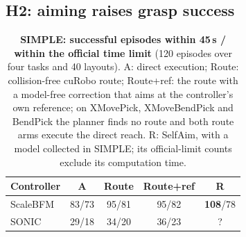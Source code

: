 \documentclass[conference]{IEEEtran}
\newcommand{\Ad}{\textsc{A}}       %
\newcommand{\Rr}{\textsc{R}}       %
\begin{document}
\subsection{H2: aiming raises grasp success}
\begin{table}[t]
\centering
\caption{\textbf{SIMPLE: successful episodes within 45\,s / within the official time limit} (120 episodes over four tasks and 40 layouts). \Ad: direct execution; Route: collision-free cuRobo route; Route+ref: the route with a model-free correction that aims at the controller's own reference; on XMovePick, XMoveBendPick and BendPick the planner finds no route and both route arms execute the direct reach. \Rr: SelfAim, with a model collected in SIMPLE; its official-limit counts exclude its computation time.}
\label{tab:simple}
\begin{tabular}{lcccc}
\toprule
Controller & \Ad & Route & Route+ref & \Rr \\
\midrule
ScaleBFM & 83/73 & 95/81 & 95/82 & \textbf{108}/78 \\
SONIC    & 29/18 & 34/20 & 36/23 & {\color{red}?} \\
\bottomrule
\end{tabular}
\end{table}
\end{document}
